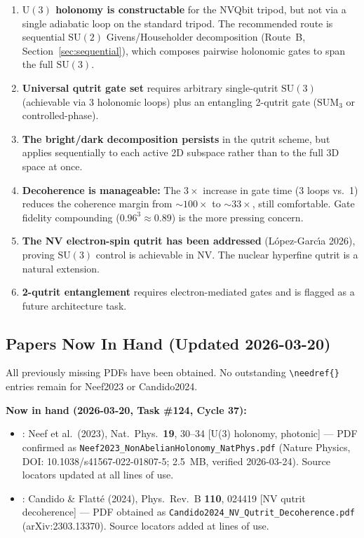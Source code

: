 \documentclass[11pt,letterpaper]{article}
\newcommand{\SU}{\mathrm{SU}}
\newcommand{\UU}{\mathrm{U}}
\begin{document}
\begin{enumerate}
  \item \textbf{$\UU(3)$ holonomy is constructable} for the NVQbit tripod, but not via a
    single adiabatic loop on the standard tripod. The recommended route is sequential
    $\SU(2)$ Givens/Householder decomposition (Route~B, Section~\ref{sec:sequential}),
    which composes pairwise holonomic gates to span the full $\SU(3)$.

  \item \textbf{Universal qutrit gate set} requires arbitrary single-qutrit $\SU(3)$
    (achievable via 3 holonomic loops) plus an entangling 2-qutrit gate ($\text{SUM}_3$
    or controlled-phase).

  \item \textbf{The bright/dark decomposition persists} in the qutrit scheme, but applies
    sequentially to each active 2D subspace rather than to the full 3D space at once.

  \item \textbf{Decoherence is manageable:} The $3\times$ increase in gate time (3 loops
    vs.\ 1) reduces the coherence margin from $\sim 100\times$ to $\sim 33\times$, still
    comfortable. Gate fidelity compounding ($0.96^3 \approx 0.89$) is the more pressing
    concern.

  \item \textbf{The NV electron-spin qutrit has been addressed} (L\'{o}pez-Garc\'{\i}a
    2026), proving $\SU(3)$ control is achievable in NV. The nuclear hyperfine qutrit is
    a natural extension.

  \item \textbf{2-qutrit entanglement} requires electron-mediated gates and is flagged
    as a future architecture task.
\end{enumerate}

\subsection{Papers Now In Hand (Updated 2026-03-20)}

All previously missing PDFs have been obtained. No outstanding \texttt{\textbackslash needref\{\}} entries remain
for Neef2023 or Candido2024.

\noindent \textbf{Now in hand (2026-03-20, Task \#124, Cycle 37):}
\begin{itemize}
  \item \cite{Neef2023}: Neef et al.\ (2023), Nat.\ Phys.\ \textbf{19}, 30--34 [U(3) holonomy, photonic] ---
    PDF confirmed as \texttt{Neef2023\_NonAbelianHolonomy\_NatPhys.pdf} (Nature Physics, DOI: 10.1038/s41567-022-01807-5; 2.5~MB, verified 2026-03-24).
    Source locators updated at all lines of use. %
  \item \cite{Candido2024}: Candido \& Flatt\'{e} (2024), Phys.\ Rev.\ B \textbf{110}, 024419 [NV qutrit decoherence] ---
    PDF obtained as \texttt{Candido2024\_NV\_Qutrit\_Decoherence.pdf} (arXiv:2303.13370).
    Source locators added at lines of use. %
\end{itemize}
\end{document}
